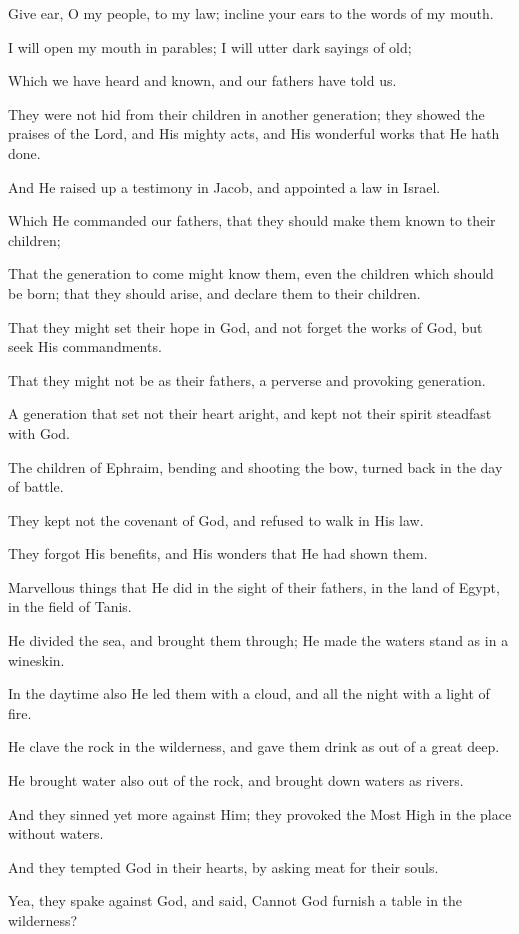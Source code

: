 Give ear, O my people, to my law; incline your ears to the words of my mouth.

I will open my mouth in parables; I will utter dark sayings of old;

Which we have heard and known, and our fathers have told us.

They were not hid from their children in another generation; they showed the praises of the Lord, and His mighty acts, and His wonderful works that He hath done.

And He raised up a testimony in Jacob, and appointed a law in Israel.

Which He commanded our fathers, that they should make them known to their children;

That the generation to come might know them, even the children which should be born; that they should arise, and declare them to their children.

That they might set their hope in God, and not forget the works of God, but seek His commandments.

That they might not be as their fathers, a perverse and provoking generation.

A generation that set not their heart aright, and kept not their spirit steadfast with God.

The children of Ephraim, bending and shooting the bow, turned back in the day of battle.

They kept not the covenant of God, and refused to walk in His law.

They forgot His benefits, and His wonders that He had shown them.

Marvellous things that He did in the sight of their fathers, in the land of Egypt, in the field of Tanis.

He divided the sea, and brought them through; He made the waters stand as in a wineskin.

In the daytime also He led them with a cloud, and all the night with a light of fire.

He clave the rock in the wilderness, and gave them drink as out of a great deep.

He brought water also out of the rock, and brought down waters as rivers.

And they sinned yet more against Him; they provoked the Most High in the place without waters.

And they tempted God in their hearts, by asking meat for their souls.

Yea, they spake against God, and said, Cannot God furnish a table in the wilderness?


